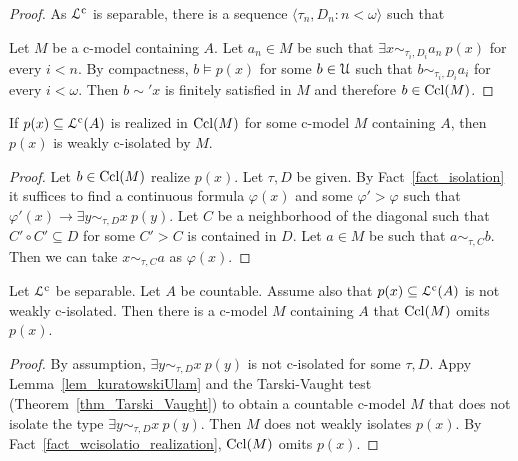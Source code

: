 \documentclass[10pt,oneside]{amsproc}
\begin{document}
{\begin{proof}
  As ${\EuScript L}^{\rm c}$ is separable, there is a sequence $\langle\tau_n,D_n:n<\omega\rangle$ such that 
  
  
  Let $M$ be a c-model containing $A$.
  Let $a_n\in M$ be such that $\exists x\sim_{\tau_i,D_i}a_n\ p(x)$ for every $i<n$.
  By compactness, $b\models p(x)$ for some $b\in{\EuScript U}$ such that $b\sim_{\tau_i,D_i}a_i$ for every $i<\omega$.
  Then $b\sim'x$ is finitely satisfied in $M$ and therefore $b\in{\rm Ccl}(M)$.
\end{proof}

 \begin{fact}\label{fact_wcisolatio_realization} 
   If $p(x)\subseteq{\EuScript L}^{\rm c}(A)$ is realized in ${\rm Ccl}(M)$ for some c-model $M$ containing $A$, then $p(x)$ is weakly c-isolated by $M$.
 \end{fact}
 
\begin{proof}
  Let $b\in{\rm Ccl}(M)$ realize $p(x)$.
  Let $\tau,D$ be given.
  By Fact~\ref{fact_isolation} it suffices to find a continuous formula $\varphi(x)$ and some $\varphi'>\varphi$ such that $\varphi'(x)\rightarrow\exists y\sim_{\tau,D}x\ p(y)$.
  Let $C$ be a neighborhood of the diagonal such that $C'\circ C'\subseteq D$ for some $C'>C$ is contained in $D$.
  Let $a\in M$ be such that $a\sim_{\tau,C} b$.
  Then we can take $x\sim_{\tau,C}a$ as $\varphi(x)$.
\end{proof}

\begin{theorem}\label{prop_cOTT}
  Let ${\EuScript L}^{\rm c}$ be separable.
  Let $A$ be countable.
  Assume also that $p(x)\subseteq{\EuScript L}^{\rm c}(A)$ is not weakly c-isolated.
  Then there is a c-model $M$ containing $A$ that ${\rm Ccl}(M)$ omits $p(x)$. 
\end{theorem}

\begin{proof}
  By assumption, $\exists y\sim_{\tau,D}x\ p(y)$ is not c-isolated for some $\tau,D$. 
  Appy Lemma~\ref{lem_kuratowskiUlam} and the Tarski-Vaught test (Theorem~\ref{thm_Tarski_Vaught}) to obtain a countable c-model $M$ that does not isolate the type $\exists y\sim_{\tau,D}x\ p(y)$.
  Then $M$ does not weakly isolates $p(x)$.
  By Fact~\ref{fact_wcisolatio_realization}, ${\rm Ccl}(M)$ omits $p(x)$. 
\end{proof}

}
\end{document}
